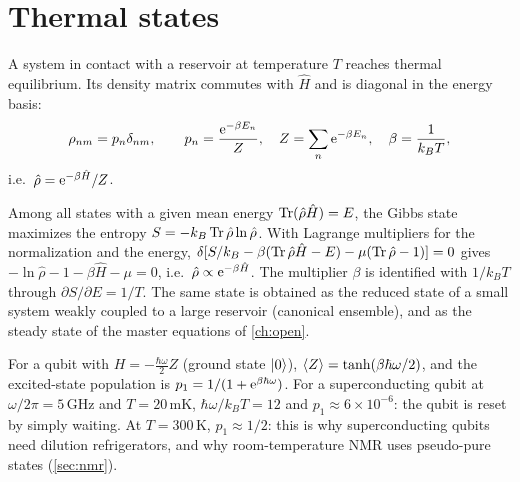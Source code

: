 \section{Thermal states}\label{sec:thermal}
A system in contact with a reservoir at temperature $T$ reaches thermal equilibrium. Its density matrix commutes with $\hat H$ and is diagonal in the energy basis:
\begin{equation}
  \rho_{nm}=p_n\delta_{nm},\qquad p_n=\frac{\mathrm e^{-\beta E_n}}Z,\quad Z=\sum_n\mathrm e^{-\beta E_n},\quad\beta=\frac1{k_BT},
\end{equation}
i.e.\ $\hat\rho=\mathrm e^{-\beta\hat H}/Z$.
\begin{origin}
Among all states with a given mean energy $\operatorname{Tr}(\hat\rho\hat H)=E$, the Gibbs state maximizes the entropy $S=-k_B\operatorname{Tr}\hat\rho\ln\hat\rho$. With Lagrange multipliers for the
normalization and the energy, $\delta[S/k_B-\beta(\operatorname{Tr}\hat\rho\hat H-E)-\mu(\operatorname{Tr}\hat\rho-1)]=0$ gives $-\ln\hat\rho-1-\beta\hat H-\mu=0$, i.e.\ $\hat\rho\propto\mathrm e^{-\beta\hat H}$.
The multiplier $\beta$ is identified with $1/k_BT$ through $\partial S/\partial E=1/T$. The same state is obtained as the reduced state of a small system weakly coupled to a large
reservoir (canonical ensemble), and as the steady state of the master equations of \cref{ch:open}.
\end{origin}
For a qubit with $H=-\frac{\hbar\omega}2Z$ (ground state $\left|0\right\rangle$), $\left\langle Z\right\rangle=\tanh(\beta\hbar\omega/2)$, and the excited-state population is
$p_1=1/(1+\mathrm e^{\beta\hbar\omega})$. For a superconducting qubit at $\omega/2\pi=5$\,GHz and $T=20$\,mK, $\hbar\omega/k_BT=12$ and $p_1\approx6\times10^{-6}$: the qubit is
reset by simply waiting. At $T=300$\,K, $p_1\approx1/2$: this is why superconducting qubits need dilution refrigerators, and why room-temperature NMR uses
pseudo-pure states (\cref{sec:nmr}).

